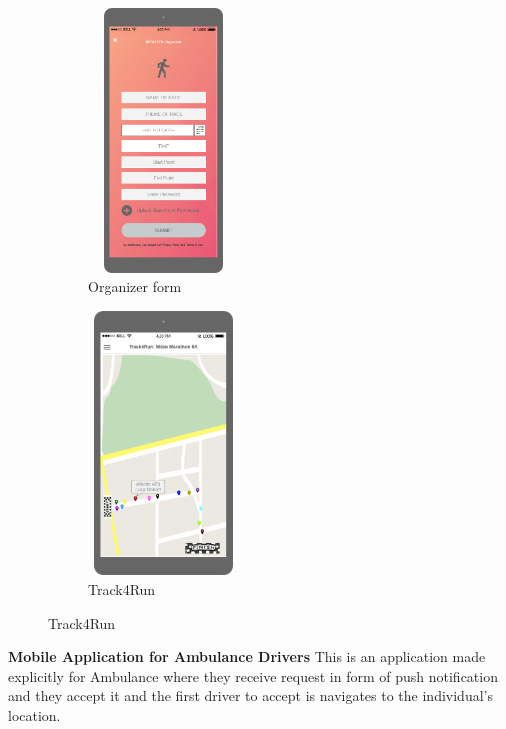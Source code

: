 \begin{figure}[H]
	\centering
	\begin{subfigure}[b]{0.4\textwidth}	
		\includegraphics[width=4cm,height=7cm]		{./Mockups/9_T-Oragnizer.png}
      	\caption{Organizer form}
        \label{TrackMe_org}
	 \end{subfigure}
     \begin{subfigure}[b]{0.4\textwidth}	
		\includegraphics[width=4cm,height=7cm]		{./Mockups/9-Track4Run.png}
      	\caption{Track4Run}
        \label{TrackMe_Track4Run}
	 \end{subfigure}
\end{figure}

\textbf{Mobile Application for Ambulance Drivers}
This is an application made explicitly for Ambulance where they receive request in form of push notification and they accept it and the first driver to accept is navigates to the individual's location.

